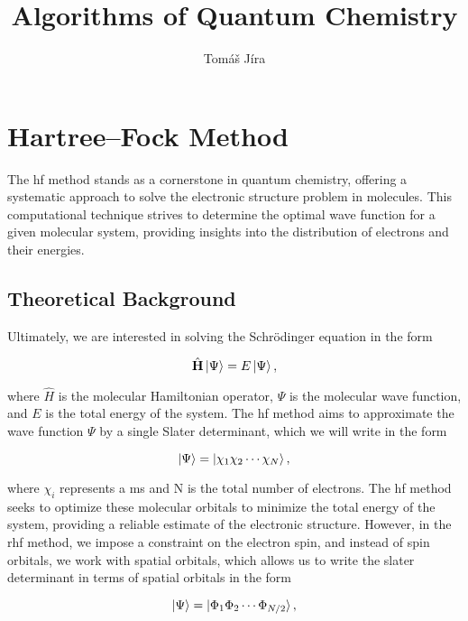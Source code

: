 \documentclass[open=any,parskip=half,11pt]{scrbook}
\title{Algorithms of Quantum Chemistry}
\author{Tom\'a\v s J\'ira}
\begin{document}
\maketitle
\tableofcontents

\chapter{Hartree--Fock Method}\label{hartreefock-method}

The \acrfull{hf} method stands as a cornerstone in quantum chemistry, offering a systematic approach to solve the electronic structure problem in molecules. This computational technique strives to determine the optimal wave function for a given molecular system, providing insights into the distribution of electrons and their energies.

\section{Theoretical Background}\label{theoretical-background}

Ultimately, we are interested in solving the Schrödinger equation in the form

\begin{equation}
\hat{\mathbf{H}}\ket{\Psi}=E\ket{\Psi},
\end{equation}

where \(\hat{H}\) is the molecular Hamiltonian operator, \(\Psi\) is the molecular wave function, and \(E\) is the total energy of the system. The \acrshort{hf} method aims to approximate the wave function \(\Psi\) by a single Slater determinant, which we will write in the form

\begin{equation}
\ket{\Psi}=\ket{\chi_1\chi_2\cdots\chi_N},
\end{equation}

where \(\chi_i\) represents a \acrfull{ms} and N is the total number of electrons. The \acrshort{hf} method seeks to optimize these molecular orbitals to minimize the total energy of the system, providing a reliable estimate of the electronic structure. However, in the \acrfull{rhf} method, we impose a constraint on the electron spin, and instead of spin orbitals, we work with spatial orbitals, which allows us to write the slater determinant in terms of spatial orbitals in the form

\begin{equation}
\ket{\Psi}=\ket{\Phi_1\Phi_2\cdots\Phi_{N/2}},
\end{equation}
\end{document}
